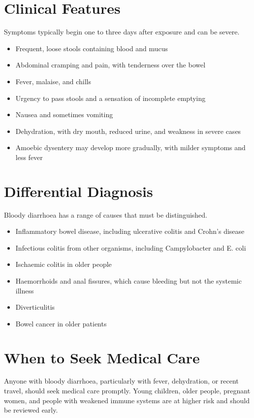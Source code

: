 \section*{Clinical Features}
Symptoms typically begin one to three days after exposure and can be severe.
\begin{itemize}
    \item Frequent, loose stools containing blood and mucus
    \item Abdominal cramping and pain, with tenderness over the bowel
    \item Fever, malaise, and chills
    \item Urgency to pass stools and a sensation of incomplete emptying
    \item Nausea and sometimes vomiting
    \item Dehydration, with dry mouth, reduced urine, and weakness in severe cases
    \item Amoebic dysentery may develop more gradually, with milder symptoms and less fever
\end{itemize}

\section*{Differential Diagnosis}
Bloody diarrhoea has a range of causes that must be distinguished.
\begin{itemize}
    \item Inflammatory bowel disease, including ulcerative colitis and Crohn's disease
    \item Infectious colitis from other organisms, including Campylobacter and E. coli
    \item Ischaemic colitis in older people
    \item Haemorrhoids and anal fissures, which cause bleeding but not the systemic illness
    \item Diverticulitis
    \item Bowel cancer in older patients
\end{itemize}

\section*{When to Seek Medical Care}
Anyone with bloody diarrhoea, particularly with fever, dehydration, or recent travel, should seek medical care promptly. Young children, older people, pregnant women, and people with weakened immune systems are at higher risk and should be reviewed early.

